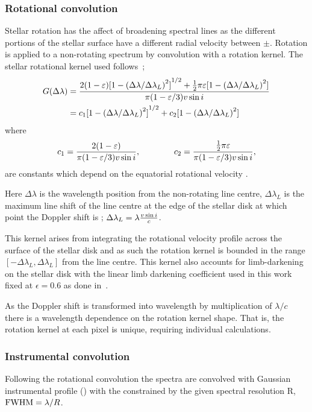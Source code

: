 \subsubsection*{Rotational convolution}
\label{subsubsec:rotational_convolution}
Stellar rotation has the affect of broadening spectral lines as the different portions of the stellar surface have a different radial velocity between \(\pm\)\Vsini{}.
Rotation is applied to a non-rotating spectrum by convolution with a rotation kernel.
The stellar rotational kernel used follows~\citet{gray_observation_2005};
\begin{align}
G(\Delta\lambda) &= \frac{2(1-\varepsilon){[1-{(\Delta\lambda /{\Delta\lambda}_{L})}^{2}]}^{1/2} +   \frac{1}{2}\pi\varepsilon[1-{(\Delta\lambda /{\Delta\lambda}_{L})}^{2}]}{\pi (1-\varepsilon/3) v\sin{i}}\\
&= c_{1}{[1- {(\Delta\lambda /\Delta\lambda_{L})}^{2}]}^{1/2} + c_{2}[1-{(\Delta\lambda /\Delta\lambda_{L})}^{2}] \label{eqn:rotational_profile}
\end{align}
where
\begin{equation}
{c}_{1} = \frac{2(1-\varepsilon)} {\pi (1-\varepsilon/3)v\sin{i}}, \hspace{4em} {c}_{2} = \frac{\frac{1}{2}\pi\varepsilon} {\pi (1-\varepsilon/3)v\sin{i}},
\end{equation}
are constants which depend on the equatorial rotational velocity \Vsini{}.

Here $\Delta\lambda$ is the wavelength position from the non-rotating line centre, $\Delta\lambda_{L}$ is the maximum line shift of the line centre at the edge of the stellar disk at which point the Doppler shift is \Vsini{}; $\Delta\lambda_{L} = \lambda \frac{v\sin{i}}{c}$.

This kernel arises from integrating the rotational velocity profile across the surface of the stellar disk and as such the rotation kernel is bounded in the range $[-\Delta\lambda_L, \Delta\lambda_{L}]$ from the line centre.
This kernel also accounts for limb-darkening on the stellar disk with the linear limb darkening coefficient used in this work fixed at $\epsilon=0.6$ as done in~\citet{figueira_radial_2016}.

As the Doppler shift \Vsini{} is transformed into wavelength by multiplication of $\lambda / c$ there is a wavelength dependence on the rotation kernel shape.
That is, the rotation kernel at each pixel is unique, requiring individual calculations.

\subsubsection*{Instrumental convolution}
\label{subsubsec:instrumental_convolution}
Following the rotational convolution the spectra are convolved with Gaussian instrumental profile ({\IP{}}) with the {\fwhm}  constrained by the given spectral resolution R, $\textrm{FWHM}=\lambda/R$.

